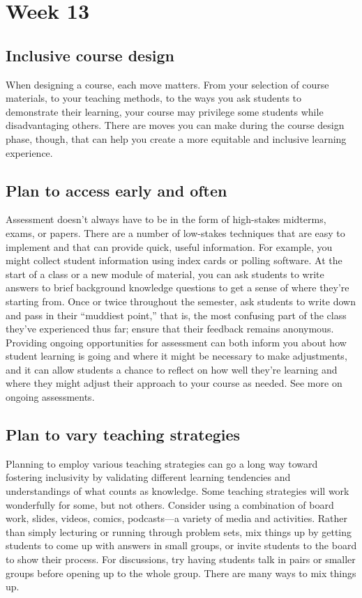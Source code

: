 \section{Week 13}
\label{sec:week-13}

\subsection{Inclusive course design}
\label{sec:incl-course-design}

When designing a course, each move matters. From your selection of course materials, to your teaching methods, to the ways you ask students to demonstrate their learning, your course may privilege some students while disadvantaging others. There are moves you can make during the course design phase, though, that can help you create a more equitable and inclusive learning experience.

\subsection{Plan to access early and often}
\label{sec:plan-access-early}

Assessment doesn’t always have to be in the form of high-stakes midterms, exams, or papers. There are a number of low-stakes techniques that are easy to implement and that can provide quick, useful information. For example, you might collect student information using index cards or polling software. At the start of a class or a new module of material, you can ask students to write answers to brief background knowledge questions to get a sense of where they’re starting from. Once or twice throughout the semester, ask students to write down and pass in their “muddiest point,” that is, the most confusing part of the class they’ve experienced thus far; ensure that their feedback remains anonymous. Providing ongoing opportunities for assessment can both inform you about how student learning is going and where it might be necessary to make adjustments, and it can allow students a chance to reflect on how well they’re learning and where they might adjust their approach to your course as needed. See more on ongoing assessments.

\subsection{Plan to vary teaching strategies}
\label{sec:plan-vary-teaching}

Planning to employ various teaching strategies can go a long way toward fostering inclusivity by validating different learning tendencies and understandings of what counts as knowledge. Some teaching strategies will work wonderfully for some, but not others. Consider using a combination of board work, slides, videos, comics, podcasts—a variety of media and activities. Rather than simply lecturing or running through problem sets, mix things up by getting students to come up with answers in small groups, or invite students to the board to show their process. For discussions, try having students talk in pairs or smaller groups before opening up to the whole group. There are many ways to mix things up.

